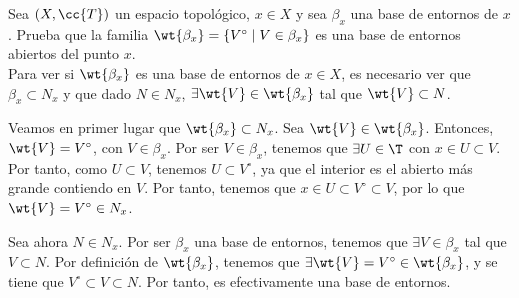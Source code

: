 \begin{ejercicio}
    Sea $(X,\cc{T})$ un espacio topológico, $x\in X$ y sea $\beta_x$ una base de entornos de $x$. Prueba que la familia $\wt{\beta_x}=\{V^\circ\mid V\in \beta_x\}$ es una base de entornos abiertos del punto $x$.\\

    Para ver si $\wt{\beta_x}$ es una base de entornos de $x\in X$, es necesario ver que $\beta_x\subset N_x$ y que dado $N\in N_x$, $\exists \wt{V}\in \wt{\beta_x}$ tal que $\wt{V}\subset N$.

    Veamos en primer lugar que $\wt{\beta_x}\subset N_x$. Sea $\wt{V}\in \wt{\beta_x}$. Entonces, $\wt{V}=V^\circ$, con $V\in \beta_x$. Por ser $V\in \beta_x$, tenemos que $\exists U\in \T$ con $x\in U\subset V$. Por tanto, como $U\subset V$, tenemos $U\subset V^\circ$, ya que el interior es el abierto más grande contiendo en $V$. Por tanto, tenemos que $x\in U\subset V^\circ \subset V$, por lo que $\wt{V}=V^\circ \in N_x$.

    Sea ahora $N\in N_x$. Por ser $\beta_x$ una base de entornos, tenemos que $\exists V\in \beta_x$ tal que $V\subset N$. Por definición de $\wt{\beta_x}$, tenemos que $\exists \wt{V}=V^\circ \in \wt{\beta_x}$, y se tiene que $V^\circ\subset V\subset N$. Por tanto, es efectivamente una base de entornos.
\end{ejercicio}

